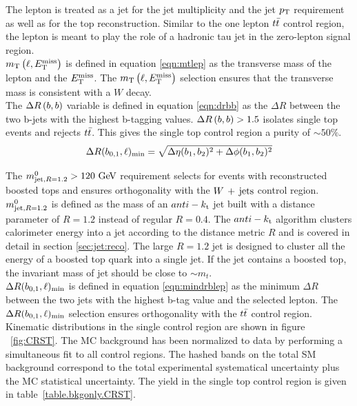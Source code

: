 \indent The lepton is treated as a jet for the jet multiplicity and the jet $p_{\mathrm{T}}$ requirement as well as for the top reconstruction.  Similar to the one lepton $t\bar{t}$ control region, the lepton is meant to play the role of a hadronic tau jet in the zero-lepton signal region. \\

\indent $m_{\mathrm{T}}\left(\ell,E_{\mathrm{T}}^{\mathrm{miss}}\right)$ is defined in equation \ref{eqn:mtlep} as the transverse mass of the lepton and the $E_{\mathrm{T}}^{\mathrm{miss}}$.  The $m_{\mathrm{T}}\left(\ell,E_{\mathrm{T}}^{\mathrm{miss}}\right)$ selection ensures that the transverse mass is consistent with a $W$ decay.  \\

\indent The $\Delta R\left(b,b\right)$ variable is defined in equation \ref{eqn:drbb} as the $\Delta R$ between the two b-jets with the highest b-tagging values.  $\Delta R\left(b,b\right) > 1.5$ isolates single top events and rejects $t\bar{t}$.  This gives the single top control region a purity of $\sim50\%$. \\

\begin{equation}
\mindrblep = \sqrt{ \Delta\eta(b_1, b_2)^2 + \Delta\phi(b_1, b_2)^2}
\label{eqn:mindrblep}
\end{equation}

\indent The $\mantikttwelvezero > 120 \gev$ requirement selects for events with reconstructed boosted tops and ensures orthogonality with the $W\,+\,\mathrm{jets}$ control region.  $m^{0}_{\mathrm{jet,}R=1.2}$ is defined as the mass of an $anti-k_{\rm{t}}$ jet built with a distance parameter of $R=1.2$ instead of regular $R=0.4$.  The $anti-k_{\rm{t}}$ algorithm clusters calorimeter energy into a jet according to the distance metric $R$ and is covered in detail in section \ref{sec:jet:reco}.  The large $R=1.2$ jet is designed to cluster all the energy of a boosted top quark into a single jet.  If the jet contains a boosted top, the invariant mass of jet should be close to $\sim m_t$.  \\

\indent $\Delta R(b_{0,1},\ell)_{\mathrm{min}}$ is defined in equation \ref{eqn:mindrblep} as the minimum $\Delta R$ between the two jets with the highest b-tag value and the selected lepton.  The $\Delta R(b_{0,1},\ell)_{\mathrm{min}}$ selection ensures orthogonality with the $t\bar{t}$ control region.  \\

\indent Kinematic distributions in the single control region are shown in figure ~\ref{fig:CRST}.  The MC background has been normalized to data by performing a simultaneous fit to all control regions.  The hashed bands on the total SM background correspond to the total experimental systematical uncertainty plus the MC statistical uncertainty.  The yield in the single top control region is given in table~\ref{table.bkgonly.CRST}.  \\

